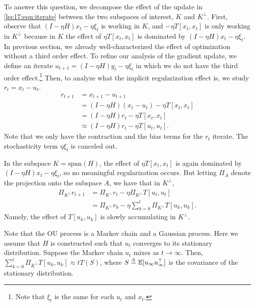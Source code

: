 To answer this question, we decompose the effect of the update in \eqref{lec17:eqn:iterate} between the two subspaces of interest, $K$ and $K^\perp$. First, observe that $(I-\eta H)x_t - \eta \xi_t$ is working in $K$, and $- \eta T [x_t,x_t]$ is only working in $K^\perp$ because in $K$ the effect of $\eta T [x_t,x_t]$ is dominated by $(I-\eta H)x_t - \eta \xi_t$. In previous section, we already well-characterized the effect of optimization without a third order effect. To refine our analysis of the gradient update, we define an iterate $u_{t+1} = (I - \eta H)y_t - \eta \xi_t$ in which we do not have the third order effect.\footnote{Note that $\xi_t$ is the same for each $u_t$ and $x_t$.} Then, to analyze what the implicit regularization effect is, we study $r_t = x_t - u_t$.
\begin{align*}
r_{t + 1} &= x_{t+1} - u_{t+1}\\
&= (I-\eta H)(x_t - u_t) - \eta T[x_t,x_t]\\
&= (I-\eta H)r_t - \eta T[x_t,x_t]\\
&\approx (I-\eta H)r_t - \eta T[u_t,u_t].
\end{align*}
Note that we only have the contraction and the bias terms for the $r_t$ iterate. The stochasticity term $\eta \xi_t$ is canceled out. 

In the subspace $K = \text{span}(H)$, the effect of $\eta T [x_t,x_t]$ is again dominated by $(I-\eta H)x_t - \eta \xi_t$, so no meaningful regularization occurs. But letting $\Pi_{A}$ denote the projection onto the subspace $A$, we have that in $K^\perp$,
\begin{align}
\Pi_{K^\perp}r_{t+1} &= \Pi_{K^\perp}r_t - \eta \Pi_{K^\perp} T[u_t,u_t]\\
&=\Pi_{K^\perp}r_0 - \eta \sum_{k=0}^{t}\Pi_{K^\perp}T[u_k,u_k].
\end{align}
Namely, the effect of $T[u_k,u_k]$ is slowly accumulating in ${K^\perp}$.

Note that the OU process is a Markov chain and a Gaussian process. Here we assume that $H$ is constructed such that $u_t$ converges to its stationary distribution. Suppose the Markov chain $u_t$ mixes as $t\rightarrow \infty$. Then, $\sum_{k=0}^{t}\Pi_{K^\perp}T[u_k,u_k] \approx tT(S)$, where $S \defeq \Exp[u_{\infty}u_{\infty}^\top]$ is the covariance of the stationary distribution.


